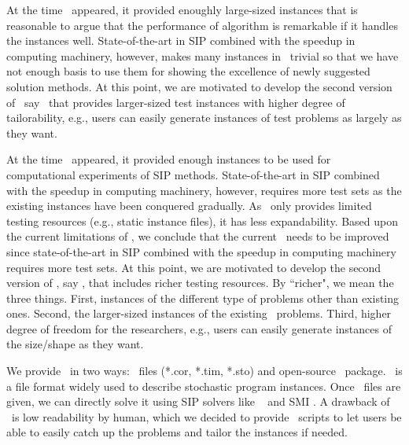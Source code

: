 At the time \siplib\ appeared, it provided enoughly large-sized instances that is reasonable 
to argue that the performance of algorithm is remarkable if it handles the instances well. 
State-of-the-art in SIP combined with the speedup in computing machinery, however, makes many 
instances in \siplib\ trivial so that we have not enough basis to use them for showing the 
excellence of newly suggested solution methods. At this point, we are motivated to develop 
the second version of \siplib\, say \siplibtwo\ that provides larger-sized test instances 
with higher degree of tailorability, e.g., users can easily generate instances of test 
problems as largely as they want.%

At the time \siplib\ appeared, it provided enough instances to be used for computational 
experiments of SIP methods. State-of-the-art in SIP combined with the speedup in computing 
machinery, however, requires more test sets as the existing instances have been conquered 
gradually. As \siplib\ only provides limited testing resources (e.g., static instance files), 
it has less expandability. 
Based upon the current limitations of \siplib, we conclude that the current \siplib\ needs to 
be improved since state-of-the-art in SIP combined with the speedup in computing machinery 
requires more test sets. At this point, we are motivated to develop the second version of 
\siplib, say \siplibtwo, that includes richer testing resources. By ``richer", we mean the 
three things. First, instances of the different type of problems other than existing ones. 
Second, the larger-sized instances of the existing \siplib\ problems. Third, higher degree of 
freedom for the researchers, e.g., users can easily generate instances of the size/shape as 
they want.

We provide \siplibtwo\ in two ways: \smps\ files (*.cor, *.tim, *.sto) and open-source 
\julia\ package. \smps\ is a file format widely used to describe stochastic program 
instances. Once \smps\ files are given, we can directly solve it using SIP solvers like \dsp\ 
\cite{web:DSP} and \textsf{SMI} \cite{web:SMI}. A drawback of \smps\ is low 
readability by human, which we decided to provide \julia\ scripts to let users be able to 
easily catch up the problems and tailor the instances if needed.

